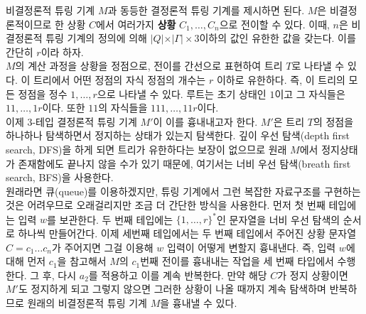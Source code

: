 \documentclass[b5paper, 11pt]{book}
\theoremstyle{definition}
\newenvironment{pf*}{\pushQED{\qed}\pf}
{\popQED\endpf}
\begin{document}
\begin{pf*}
    비결정론적 튜링 기계 $M$과 동등한 결정론적 튜링 기계를 제시하면 된다. $M$은 비결정론적이므로 한 상황 $C$에서 여러가지 \textbf{상황} $C_1, \ldots, C_n$으로 전이할 수 있다. 이때, $n$은 비결정론적 튜링 기계의 정의에 의해 $\vert Q \vert \times \vert \Gamma \vert \times 3$이하의 값인 유한한 값을 갖는다. 이를 간단히 $r$이라 하자. \\ 
    $M$의 계산 과정을 상황을 정점으로, 전이를 간선으로 표현하여 트리 $T$로 나타낼 수 있다. 이 트리에서 어떤 정점의 자식 정점의 개수는 $r$ 이하로 유한하다. 즉, 이 트리의 모든 정점을 정수 $1, \ldots, r$으로 나타낼 수 있다. 루트는 초기 상태인 $1$이고 그 자식들은 $11, \ldots, 1r$이다. 또한 $11$의 자식들을 $111, \ldots, 11r$이다. \\
    이제 3-테입 결정론적 튜링 기계 $M'$이 이를 흉내내고자 한다. $M'$은 트리 $T$의 정점을 하나하나 탐색하면서 정지하는 상태가 있는지 탐색한다. 깊이 우선 탐색(depth first search, DFS)을 하게 되면 트리가 유한하다는 보장이 없으므로 원래 $M$에서 정지상태가 존재함에도 끝나지 않을 수가 있기 때문에, 여기서는 너비 우선 탐색(breath first search, BFS)을 사용한다. \\ 
    원래라면 큐(queue)를 이용하겠지만, 튜링 기계에서 그런 복잡한 자료구조를 구현하는 것은 어려우므로 오래걸리지만 조금 더 간단한 방식을 사용한다. 먼저 첫 번째 테입에는 입력 $w$를 보관한다. 두 번째 테입에는 $\{1, \ldots, r\}^*$인 문자열을 너비 우선 탐색의 순서로 하나씩 만들어간다. 이제 세번째 테입에서는 두 번째 테입에서 주어진 상황 문자열 $C = c_1 \ldots c_n $가 주어지면 그걸 이용해 $w$ 입력이 어떻게 변할지 흉내낸다. 즉, 입력 $w$에 대해 먼저 $c_1$을 참고해서 $M$의 $c_1$번째 전이를 흉내내는 작업을 세 번째 타입에서 수행한다. 그 후, 다시 $a_2$를 적용하고 이를 계속 반복한다. 만약 해당 $C$가 정지 상황이면 $M'$도 정지하게 되고 그렇지 않으면 그러한 상황이 나올 때까지 계속 탐색하며 반복하므로 원래의 비결정론적 튜링 기계 $M$을 흉내낼 수 있다.
\end{pf*}
\end{document}
